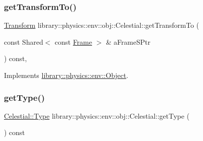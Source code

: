 \subsubsection{\texorpdfstring{get\+Transform\+To()}{getTransformTo()}}
{\footnotesize\ttfamily \hyperlink{classlibrary_1_1physics_1_1coord_1_1_transform}{Transform} library\+::physics\+::env\+::obj\+::\+Celestial\+::get\+Transform\+To (\begin{DoxyParamCaption}\item[{const Shared$<$ const \hyperlink{classlibrary_1_1physics_1_1coord_1_1_frame}{Frame} $>$ \&}]{a\+Frame\+S\+Ptr }\end{DoxyParamCaption}) const\hspace{0.3cm}{\ttfamily [override]}, {\ttfamily [virtual]}}



Implements \hyperlink{classlibrary_1_1physics_1_1env_1_1_object_abe850e2334c19ae185456cd52aeeca7d}{library\+::physics\+::env\+::\+Object}.

\mbox{\label{classlibrary_1_1physics_1_1env_1_1obj_1_1_celestial_ae020ad574249ea82679347c0a6933355}} 
\subsubsection{\texorpdfstring{get\+Type()}{getType()}}
{\footnotesize\ttfamily \hyperlink{classlibrary_1_1physics_1_1env_1_1obj_1_1_celestial_aab1f58aa727e639288d65f3d33c4f245}{Celestial\+::\+Type} library\+::physics\+::env\+::obj\+::\+Celestial\+::get\+Type (\begin{DoxyParamCaption}{ }\end{DoxyParamCaption}) const}

\mbox{\label{classlibrary_1_1physics_1_1env_1_1obj_1_1_celestial_accaa3b1fdc39a1a058fd35006f31982d}} 
